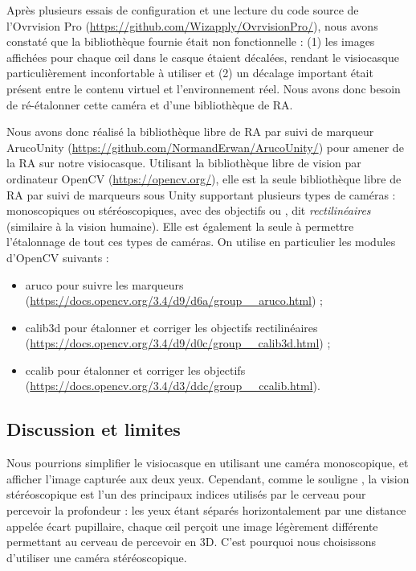 Après plusieurs essais de configuration et une lecture du code source de l'Ovrvision Pro (\url{https://github.com/Wizapply/OvrvisionPro/}), nous avons constaté que la bibliothèque fournie était non fonctionnelle : (1) les images affichées pour chaque œil dans le casque étaient décalées, rendant le visiocasque particulièrement inconfortable à utiliser et (2) un décalage important était présent entre le contenu virtuel et l'environnement réel. Nous avons donc besoin de ré-étalonner cette caméra et d'une bibliothèque de RA.

Nous avons donc réalisé la bibliothèque libre de RA par suivi de marqueur ArucoUnity (\url{https://github.com/NormandErwan/ArucoUnity/}) pour amener de la RA sur notre visiocasque. Utilisant la bibliothèque libre de vision par ordinateur OpenCV (\url{https://opencv.org/}), elle est la seule bibliothèque libre de RA par suivi de marqueurs sous Unity supportant plusieurs types de caméras : monoscopiques ou stéréoscopiques, avec des objectifs  ou , dit \emph{rectilinéaires} (similaire à la vision humaine). Elle est également la seule à permettre l'étalonnage de tout ces types de caméras. On utilise en particulier les modules d'OpenCV suivants :
\begin{itemize}
  \item aruco pour suivre les marqueurs (\url{https://docs.opencv.org/3.4/d9/d6a/group__aruco.html}) ;
  \item calib3d pour étalonner et corriger les objectifs rectilinéaires (\url{https://docs.opencv.org/3.4/d9/d0c/group__calib3d.html}) ;
  \item ccalib pour étalonner et corriger les objectifs  (\url{https://docs.opencv.org/3.4/d3/ddc/group__ccalib.html}).
\end{itemize}

\subsection{Discussion et limites}
\label{subsec:solution_discusion}

Nous pourrions simplifier le visiocasque en utilisant une caméra monoscopique, et afficher l'image capturée aux deux yeux. Cependant, comme le souligne \cite{Bourke1999}, la vision stéréoscopique est l'un des principaux indices utilisés par le cerveau pour percevoir la profondeur : les yeux étant séparés horizontalement par une distance appelée écart pupillaire, chaque œil perçoit une image légèrement différente  permettant au cerveau de percevoir en 3D. C'est pourquoi nous choisissons d'utiliser une caméra stéréoscopique.

